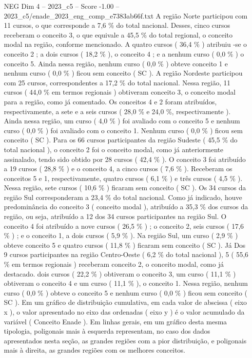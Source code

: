 \begin{textsample}{NEG Dim 4 – 2023\_c5 – Score -1.00 – 2023\_c5/enade\_2023\_eng\_comp\_e7383ab66f.txt}
A região Norte participou com 11 cursos, o que corresponde a 7,6 \% do total nacional.
Desses, cinco cursos receberam o conceito 3, o que equivale a 45,5 \% do total regional, o conceito modal na região, conforme mencionado.
A quatro cursos ( 36,4 \% ) atribuiu -se o conceito 2 ; a dois cursos ( 18,2 \% ), o conceito 4 ; e a nenhum curso ( 0,0 \% ) o conceito 5.
Ainda nessa região, nenhum curso ( 0,0 \% ) obteve conceito 1 e nenhum curso ( 0,0 \% ) ficou sem conceito ( SC ).
A região Nordeste participou com 25 cursos, correspondentes a 17,2 \% do total nacional.
Nessa região, 11 cursos ( 44,0 \% em termos regionais ) obtiveram conceito 3, o conceito modal para a região, como já comentado.
Os conceitos 4 e 2 foram atribuídos, respectivamente, a sete e a seis cursos ( 28,0 \% e 24,0 \%, respectivamente ).
Ainda nessa região, um curso ( 4,0 \% ) foi avaliado com o conceito 5 e nenhum curso ( 0,0 \% ) foi avaliado com o conceito 1.
Nenhum curso ( 0,0 \% ) ficou sem conceito ( SC ).
Para os 66 cursos participantes da região Sudeste ( 45,5 \% do total nacional ), o conceito 2 foi o conceito modal, como já anteriormente assinalado, tendo sido obtido por 28 cursos ( 42,4 \% ).
O conceito 3 foi atribuído a 19 cursos ( 28,8 \% ) e o conceito 4, a cinco cursos ( 7,6 \% ).
Receberam os conceitos 5 e 1, respectivamente, quatro cursos ( 6,1 \% ) e três cursos ( 4,5 \% ).
Nessa região, sete cursos ( 10,6 \% ) ficaram sem conceito ( SC ).
Os 34 cursos da região Sul corresponderam a 23,4 \% do total nacional.
Como já indicado, houve predominância do conceito 3 ( conceito modal ), atribuído a 35,3 \% dos cursos da região, ou seja, atribuído a 12 dos 34 cursos participantes na região Sul.
O conceito 4 foi atribuído a nove cursos ( 26,5 \% ) ; o conceito 2, seis cursos ( 17,6 \% ) ; e o conceito 1, a dois cursos ( 5,9 \% ).
Na região Sul, um curso ( 2,9 \% ) obteve conceito 5 e quatro cursos ( 11,8 \% ) ficaram sem conceito ( SC ).
Já Dos 9 cursos participantes na região Centro-Oeste ( 6,2 \% do total nacional ), 5 ( 55,6 \% em termos regionais ) receberam conceito 2, o conceito modal, como já destacado. dois cursos ( 22,2 \% ) obtiveram o conceito 3, um curso ( 11,1 \% ) obtiveram o conceito 4 e um curso ( 11,1 \% ), o conceito 1.
Nessa região, nenhum curso ( 0,0 \% ) obteve o conceito 5 e nenhum curso ( 0,0 \% ) ficou sem conceito ( SC ).
Em um gráfico de distribuição cumulativa, em cada valor de abscissa ( eixo x ), o valor apresentado no eixo das ordenadas ( eixo y ) é o valor acumulado da variável ( Conceito Enade ).
Em linhas gerais, em um gráfico desta mesma tipologia, poligonais mais à esquerda representam, no caso dos dados apresentados nesta seção, as grandes regiões com a pior distribuição, e poligonais mais à direita, as grandes regiões com os melhores conceitos.

\end{textsample}
